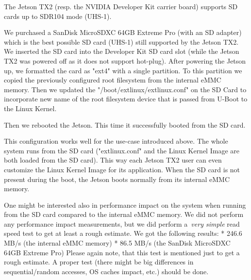 The Jetson TX2 (resp. the NVIDIA Developer Kit carrier board) supports SD cards up to SDR104 mode (UHS-1).

We purchased a SanDisk MicroSDXC 64GB Extreme Pro (with an SD adapter) which is the best possible SD card (UHS-1)
still supported by the Jetson TX2. We inserted the SD card into the Developer Kit SD card slot (while the Jetson TX2
was powered off as it does not support hot-plug). After powering the Jetson up, we formatted the card as "ext4" with
a single partition. To this partition we copied the previously configured root filesystem from the internal eMMC memory.
Then we updated the "/boot/extlinux/extlinux.conf" on the SD Card to incorporate new name of the root filesystem
device that is passed from U-Boot to the Linux Kernel.

Then we rebooted the Jetson. {\sbf This time it successfully booted from the SD card.}

This configuration works well for the use-case introduced above. {\sbf The whole system runs from the SD card}
("extlinux.conf" and the Linux Kernel Image are both loaded from the SD card). This way each Jetson TX2 user
can even customize the Linux Kernel Image for its application. When the SD card is not present during the boot,
the Jetson boots normally from its internal eMMC memory.

One might be interested also in performance impact on the system when running from the SD card compared to the
internal eMMC memory. We did not perform any performance impact measurements, but we did perform
a~{\em very simple}
read speed test to get at least a rough estimate. We got the
following results:
\begitems
* 246.6 MB/s (the internal eMMC memory)
* 86.5 MB/s (the SanDisk MicroSDXC 64GB Extreme Pro)
\enditems
Please again note, that this test is mentioned just to get a rough estimate. A proper test (there might be big
differences in sequential/random accesses, OS caches impact, etc.) should be done.


